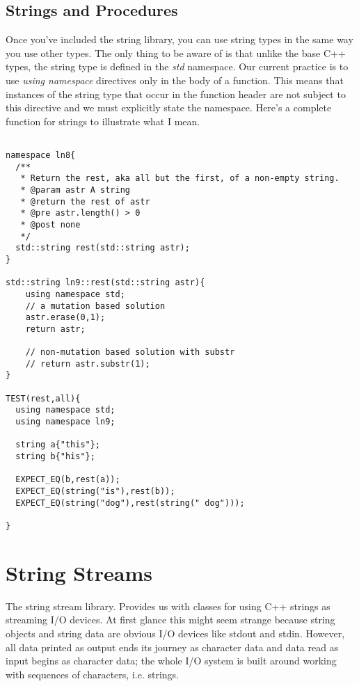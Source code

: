 \documentclass[]{tufte-handout}
\begin{document}
\subsection{Strings and Procedures}

Once you've included the string library, you can use string types in the same way you use other types. The only thing to be aware of is that unlike the base C++ types, the string type is defined in the \textit{std} namespace. Our current practice is to use \textit{using namespace} directives only in the body of a function. This means that instances of the string type that occur in the function header are not subject to this directive and we must explicitly state the namespace. Here's a complete function for strings to illustrate what I mean.

\begin{verbatim}

namespace ln8{
  /**
   * Return the rest, aka all but the first, of a non-empty string.
   * @param astr A string
   * @return the rest of astr
   * @pre astr.length() > 0
   * @post none
   */
  std::string rest(std::string astr);
}

std::string ln9::rest(std::string astr){
	using namespace std;	
	// a mutation based solution
	astr.erase(0,1);
	return astr;
	
	// non-mutation based solution with substr
	// return astr.substr(1);		 
}

TEST(rest,all){
  using namespace std;
  using namespace ln9;
  
  string a{"this"};
  string b{"his"};

  EXPECT_EQ(b,rest(a));
  EXPECT_EQ(string("is"),rest(b));
  EXPECT_EQ(string("dog"),rest(string(" dog")));	  
  
}

\end{verbatim}


\section{String Streams}


The string stream library.  Provides us with classes for using C++ strings as streaming I/O devices. At first glance this might seem strange because string objects and string data are obvious I/O devices like stdout and stdin. However, all data printed as output ends its journey as character data and data read as input begins as character data; the whole I/O system is built around working with sequences of characters, i.e. strings.
\end{document}
